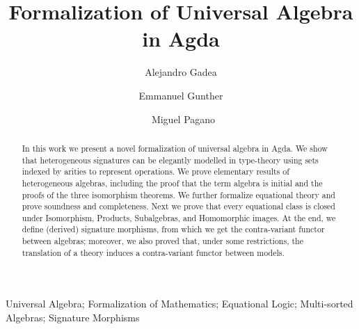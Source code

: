 \documentclass{msc}
\begin{document}


\title{Formalization of Universal Algebra in Agda}

\begin{authgrp}
  \author{Alejandro Gadea}
  \author{Emmanuel Gunther}
  \author{\, Miguel Pagano}

\end{authgrp}


\begin{abstract}
  In this work we present a novel formalization of universal algebra
  in Agda. We show that heterogeneous signatures can be elegantly
  modelled in type-theory using sets indexed by arities to represent
  operations. We prove elementary results of heterogeneous algebras,
  including the proof that the term algebra is initial and the proofs
  of the three isomorphism theorems. We further formalize equational
  theory and prove soundness and completeness. Next we prove that
  every equational class is closed under Isomorphism, Products,
  Subalgebras, and Homomorphic images. At the end, we define (derived)
  signature morphisms, from which we get the contra-variant functor
  between algebras; moreover, we also proved that, under some
  restrictions, the translation of a theory induces a contra-variant
  functor between models.
\end{abstract}

\begin{keywords}
  Universal Algebra; Formalization of Mathematics; Equational Logic; Multi-sorted Algebras; Signature Morphisms
\end{keywords}

\maketitle










\end{document}
